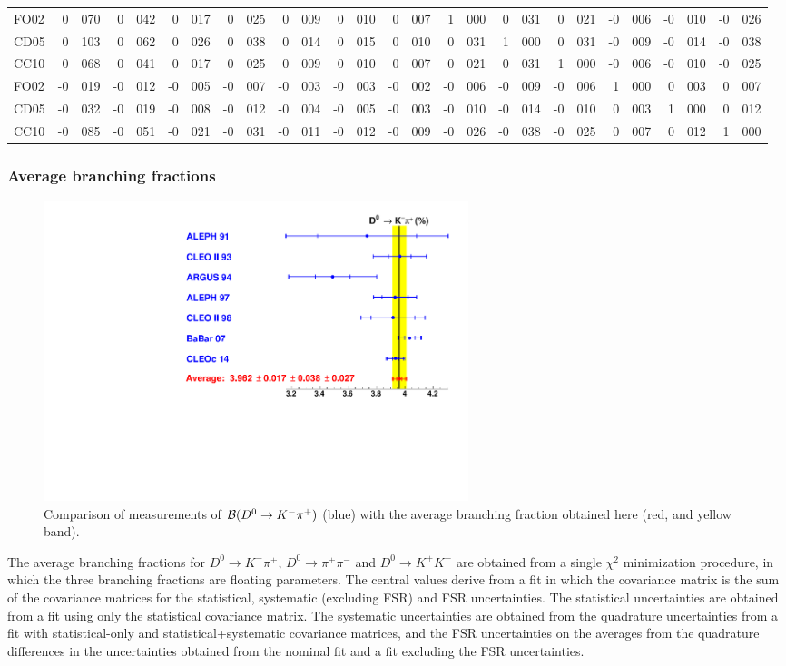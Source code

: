 \begin{table}
\begin{tabular}{lr@{.}lr@{.}lr@{.}lr@{.}lr@{.}lr@{.}lr@{.}lr@{.}lr@{.}lr@{.}lr@{.}lr@{.}lr@{.}l}
FO02 & 0&070 & 0&042 & 0&017 & 0&025 & 0&009 & 0&010 & 0&007 & 1&000 & 0&031 & 0&021 &-0&006 &-0&010 &-0&026 \\
CD05 & 0&103 & 0&062 & 0&026 & 0&038 & 0&014 & 0&015 & 0&010 & 0&031 & 1&000 & 0&031 &-0&009 &-0&014 &-0&038 \\
CC10 & 0&068 & 0&041 & 0&017 & 0&025 & 0&009 & 0&010 & 0&007 & 0&021 & 0&031 & 1&000 &-0&006 &-0&010 &-0&025 \\
FO02 &-0&019 &-0&012 &-0&005 &-0&007 &-0&003 &-0&003 &-0&002 &-0&006 &-0&009 &-0&006 & 1&000 & 0&003 & 0&007 \\
CD05 &-0&032 &-0&019 &-0&008 &-0&012 &-0&004 &-0&005 &-0&003 &-0&010 &-0&014 &-0&010 & 0&003 & 1&000 & 0&012 \\
CC10 &-0&085 &-0&051 &-0&021 &-0&031 &-0&011 &-0&012 &-0&009 &-0&026 &-0&038 &-0&025 & 0&007 & 0&012 & 1&000 \\
\hline
\end{tabular}
\end{table}


\subsubsection{Average branching fractions}

\begin{figure}
\begin{center}
\includegraphics[width=0.6\textwidth,angle=0.]{figures/charm/D0Kpi_2014.pdf}
\caption{Comparison of measurements of 
${\cal B}(D^0\to K^-\pi^+)$ (blue) with the average 
branching fraction obtained here (red, and yellow band).}
\label{D0bfs}
\end{center}
\end{figure}

The average branching fractions for $D^0\to K^-\pi^+$, $D^0\to \pi^+\pi^-$ and 
$D^0\to K^+ K^-$ are obtained from
a single $\chi^2$ minimization procedure, in which the three branching 
fractions are floating parameters. The
central values derive from a fit in which the covariance matrix is the sum 
of the covariance matrices for the
statistical, systematic (excluding FSR) and FSR uncertainties.  The 
statistical uncertainties are obtained from
a fit using only the statistical covariance matrix.  The systematic 
uncertainties are obtained from the
quadrature uncertainties from a fit with statistical-only and 
statistical+systematic covariance matrices, and
the FSR uncertainties on the averages from the quadrature 
differences in the uncertainties obtained from the
nominal fit and a fit excluding the FSR uncertainties.

